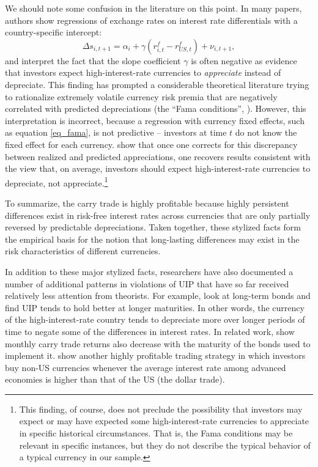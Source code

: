 \documentclass[11pt]{article}
\begin{document}
We should note some confusion in the literature on this point. In many papers, authors show regressions of exchange rates on interest rate differentials with a country-specific intercept:
\begin{equation}
    \Delta s_{i,t+1} 
    = \alpha_i + \gamma \left(r^f_{i, t} - r^f_{US, t}\right) + \nu_{i, t+1},
\label{eq_fama} 
\end{equation}
and interpret the fact that the slope coefficient $\gamma$ is often negative as evidence that investors expect high-interest-rate currencies to \textit{appreciate} instead of depreciate. This finding has prompted a considerable theoretical literature trying to rationalize extremely volatile currency risk premia that are negatively correlated with predicted depreciations (the ``Fama conditions'', \citet{Backusetal2001}). However, this interpretation is incorrect, because a regression with currency fixed effects, such as equation \ref{eq_fama}, is not predictive -- investors at time $t$ do not know the fixed effect for each currency. \citet{HassanMano2019} show that once one corrects for this discrepancy between realized and predicted appreciations, one recovers results consistent with the view that, on average, investors should expect high-interest-rate currencies to depreciate, not appreciate.\footnote{This finding, of course, does not preclude the possibility that investors may expect or may have expected some high-interest-rate currencies to appreciate in specific historical circumstances. That is, the Fama conditions may be relevant in specific instances, but they do not describe the typical behavior of a typical currency in our sample.}

To summarize, the carry trade is highly profitable because highly persistent differences exist in risk-free interest rates across currencies that are only partially reversed by predictable depreciations. Taken together, these stylized facts form the empirical basis for the notion that long-lasting differences may exist in the risk characteristics of different currencies.

In addition to these major stylized facts, researchers have also documented a number of additional patterns in violations of UIP that have so far received relatively less attention from theorists. For example, \citet{ChinnMeredith2004} look at long-term bonds and find UIP tends to hold better at longer maturities. In other words, the currency of the high-interest-rate country tends to depreciate more over longer periods of time to negate some of the differences in interest rates. In related work, \citet{LustigStathopoulosVerdelhan2019} show monthly carry trade returns also decrease with the maturity of the bonds used to implement it. \citet{LRV2014} show another highly profitable trading strategy in which investors buy non-US currencies whenever the average interest rate among advanced economies is higher than that of the US (the dollar trade). 
\end{document}
